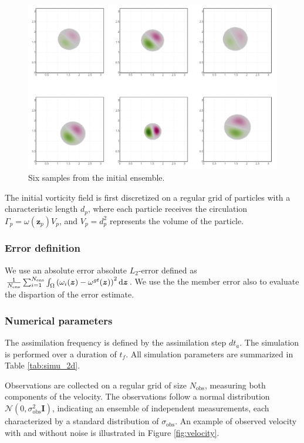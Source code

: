 \begin{figure}[ht]
	\centering
	\includegraphics[width=0.9\linewidth]{images/app2d/ensemble_sample.png}
	\caption{Six samples from the initial ensemble.}
	\label{fig:sample_ens}
\end{figure}

The initial vorticity field is first discretized on a regular grid of particles with a characteristic length $d_p$, where each particle receives the circulation $\Gamma_p = \omega(\bm z_p) V_p$, and $V_p = d_p^2$ represents the volume of the particle.

\subsubsection{Error definition}

We use an absolute error absolute \(L_2\)-error defined as $ \frac1{N_{\text{ens}}} \sum_{i = 1}^{N_{\text{ens}}} \int_\Omega \left(\omega_i(\bm{z}) - \omega^{gt}(\bm{z})\right)^2 \mathrm{d}\bm{z}$.
We use the the member error also to evaluate the dispartion of the error estimate.

\subsubsection{Numerical parameters}

The assimilation frequency is defined by the assimilation step $dt_a$. The simulation is performed over a duration of $t_f$. All simulation parameters are summarized in Table \ref{tab:simu_2d}.

Observations are collected on a regular grid of size $N_{\text{obs}}$, measuring both components of the velocity. The observations follow a normal distribution $\mathcal N(0, \sigma_{\text{obs}}^2 \bm{I})$, indicating an ensemble of independent measurements, each characterized by a standard distribution of $\sigma_{\text{obs}}$. An example of observed velocity with and without noise is illustrated in Figure \ref{fig:velocity}.

